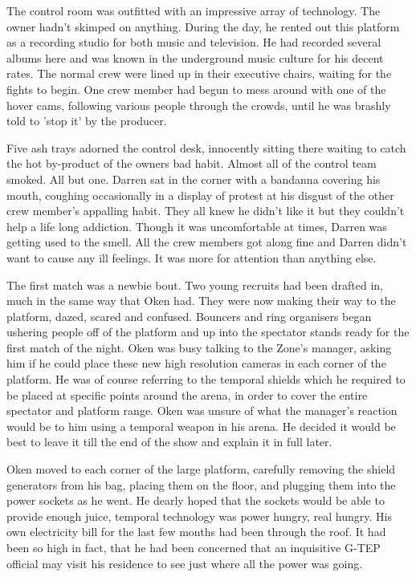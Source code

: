 The control room was outfitted with an impressive array of technology.  The owner hadn't skimped on anything.  During the day, he rented out this platform as a recording studio for both music and television.  He had recorded several albums here and was known in the underground music culture for his decent rates.  The normal crew were lined up in their executive chairs, waiting for the fights to begin.  One crew member had begun to mess around with one of the hover cams, following various people through the crowds, until he was brashly told to 'stop it' by the producer.  

Five ash trays adorned the control desk, innocently sitting there waiting to catch the hot by-product of the owners bad habit.  Almost all of the control team smoked.  All but one.  Darren sat in the corner with a bandanna covering his mouth, coughing occasionally in a display of protest at his disgust of the other crew member's appalling habit.  They all knew he didn't like it but they couldn't help a life long addiction.  Though it was uncomfortable at times, Darren was getting used to the smell.  All the crew members got along fine and Darren didn't want to cause any ill feelings.  It was more for attention than anything else.

The first match was a newbie bout.  Two young recruits had been drafted in, much in the same way that Oken had.  They were now making their way to the platform, dazed, scared and confused.  Bouncers and ring organisers began ushering people off of the platform and up into the spectator stands ready for the first match of the night.  Oken was busy talking to the Zone's manager, asking him if he could place these new high resolution cameras in each corner of the platform.  He was of course referring to the temporal shields which he required to be placed at specific points around the arena, in order to cover the entire spectator and platform range.  Oken was unsure of what the manager's reaction would be to him using a temporal weapon in his arena.  He decided it would be best to leave it till the end of the show and explain it in full later.

Oken moved to each corner of the large platform, carefully removing the shield generators from his bag, placing them on the floor, and plugging them into the power sockets as he went.  He dearly hoped that the sockets would be able to provide enough juice, temporal technology was power hungry, real hungry.  His own electricity bill for the last few months had been through the roof.  It had been so high in fact, that he had been concerned that an inquisitive G-TEP official may visit his residence to see just where all the power was going.  

